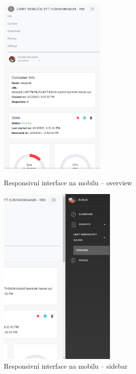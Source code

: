 \documentclass[a4paper,oneside,12pt]{report}
\begin{document}
\begin{figure}[!htb]
	\begin{minipage}{0.48\textwidth}
		\centering
		\includegraphics[height=9cm]{../img/navbarResponsiveSiderbarClosed.png}
		\caption[Responsivní interface na mobilu -- overview, vlastní tvorba]{Responsivní interface na mobilu -- overview}
		\label{fig:mobileResO}

	\end{minipage}\hfill
	\begin{minipage}{0.48\textwidth}
		\centering
		\includegraphics[height=9cm]{../img/navbarResponsiveSiderbarOpened.png}
		\caption[Responsivní interface na mobilu -- sidebar, vlastní tvorba]{Responsivní interface na mobilu -- sidebar\protect\footnotemark}
		\label{fig:mobileResS}
	\end{minipage}
\end{figure}
\end{document}
